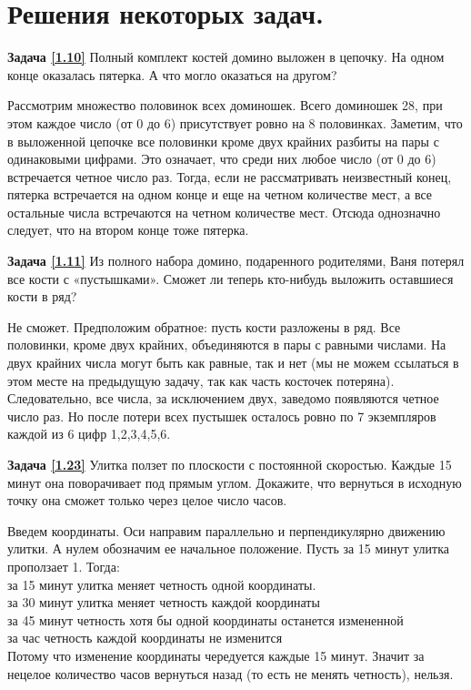 \section{ Решения некоторых задач.}

\textbf{Задача \ref{1.10}}
Полный комплект костей домино выложен в цепочку. На одном конце оказалась пятерка. А что могло оказаться на другом?


\begin{prf}
	Рассмотрим множество половинок всех доминошек. Всего доминошек 28, при этом каждое число (от 0 до 6) присутствует ровно на 8 половинках. Заметим, что в выложенной цепочке все половинки кроме двух крайних разбиты на пары с одинаковыми цифрами. Это означает, что среди них любое число (от 0 до 6) встречается четное число раз. Тогда, если не рассматривать неизвестный конец, пятерка встречается на одном конце и еще на четном количестве мест, а все остальные числа встречаются на четном количестве мест. Отсюда однозначно следует, что на втором конце тоже пятерка.
\end{prf}

\textbf{Задача \ref{1.11}}
Из полного набора домино, подаренного родителями, Ваня потерял все кости с «пустышками». Сможет ли теперь кто-нибудь выложить оставшиеся кости в ряд?

\begin{prf}
	Не сможет. Предположим обратное: пусть кости разложены в ряд. Все половинки, кроме двух крайних, объединяются в пары с равными числами. На двух крайних числа могут быть как равные, так и нет (мы не можем ссылаться в этом месте на предыдущую задачу, так как часть косточек потеряна). Следовательно, все числа, за исключением двух, заведомо появляются четное число раз. Но после потери всех пустышек осталось ровно по 7 экземпляров каждой из 6 цифр 1,2,3,4,5,6. 
\end{prf}



\textbf{Задача \ref{1.23}}
Улитка ползет по плоскости с постоянной скоростью. Каждые 15 минут она поворачивает под прямым углом. Докажите, что вернуться в исходную точку она сможет только через целое число часов.
\begin{prf}
	Введем координаты. Оси направим параллельно и перпендикулярно движению улитки. А нулем обозначим ее начальное положение. Пусть за 15 минут улитка проползает 1. Тогда: \\за 15 минут улитка меняет четность одной координаты.\\ за 30 минут улитка меняет четность каждой координаты\\ за 45 минут четность хотя бы одной координаты останется измененной\\ за час четность каждой координаты не изменится\\
	Потому что изменение координаты чередуется каждые 15 минут. Значит за нецелое количество часов вернуться назад (то есть не менять четность), нельзя.
\end{prf}


